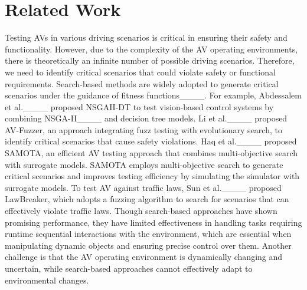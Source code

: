 \section{Related Work}
\label{sec:related_work}
\noindent Testing AVs in various driving scenarios is critical in ensuring their safety and functionality. However, due to the complexity of the AV operating environments, there is theoretically an infinite number of possible driving scenarios. Therefore, we need to identify critical scenarios that could violate safety or functional requirements.
Search-based methods are widely adopted to generate critical scenarios under the guidance of fitness functions____. For example, 
Abdessalem et al.____ proposed NSGAII-DT to test vision-based control systems by combining NSGA-II____ and decision tree models.
Li et al.____ proposed AV-Fuzzer, an approach integrating fuzz testing with evolutionary search, to identify critical scenarios that cause safety violations. Haq et al.____ proposed SAMOTA, an efficient AV testing approach that combines multi-objective search with surrogate models. SAMOTA employs multi-objective search to generate critical scenarios and improves testing efficiency by simulating the simulator with surrogate models. To test AV against traffic laws, Sun et al.____ proposed LawBreaker, which adopts a fuzzing algorithm to search for scenarios that can effectively violate traffic laws.
Though search-based approaches have shown promising performance, they have limited effectiveness in handling tasks requiring runtime sequential interactions with the environment, which are essential when manipulating dynamic objects and ensuring precise control over them. Another challenge is that the AV operating environment is dynamically changing and uncertain, while search-based approaches cannot effectively adapt to environmental changes.


